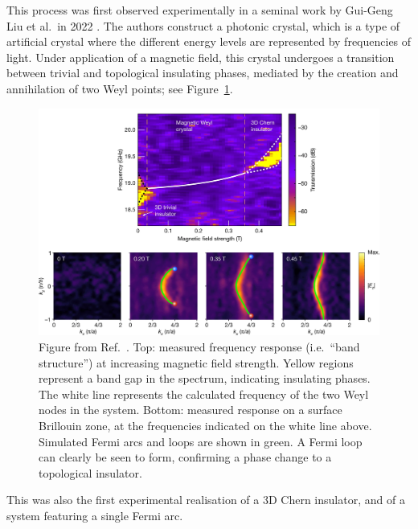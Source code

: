 This process was first observed experimentally in a seminal work by Gui-Geng Liu et al.\ in 2022 \cite{Liu_photonic-Chern-vector}. The authors construct a photonic crystal, which is a type of artificial crystal where the different energy levels are represented by frequencies of light. Under application of a magnetic field, this crystal undergoes a transition between trivial and topological insulating phases, mediated by the creation and annihilation of two Weyl points; see Figure~\ref{fig:Weyl-phase-transition}.
\begin{figure}[htb!]
	\centering
	\includegraphics[width=\linewidth]{Images/Weyl-phase-transition}
	\caption{Figure from Ref.~\cite{Liu_photonic-Chern-vector}. %
		Top: measured frequency response (i.e.\ ``band structure'') at increasing magnetic field strength. Yellow regions represent a band gap in the spectrum, indicating insulating phases. The white line represents the calculated frequency of the two Weyl nodes in the system. Bottom: measured response on a surface Brillouin zone, at the frequencies indicated on the white line above. Simulated Fermi arcs and loops are shown in green. A Fermi loop can clearly be seen to form, confirming a phase change to a topological insulator.}
	\label{fig:Weyl-phase-transition}
\end{figure}
This was also the first experimental realisation of a 3D Chern insulator, and of a system featuring a single Fermi arc.

